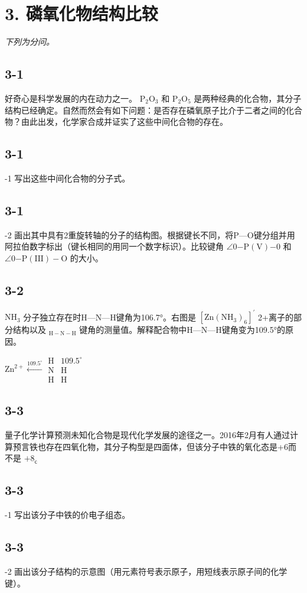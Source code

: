 \section*{3. 磷氧化物结构比较}
\textit{下列为分问。}

\subsection*{3-1}
好奇⼼是科学发展的内在动⼒之⼀。 $\mathrm { P _ { 2 } O _ { 3 } }$ 和 $\mathrm { P _ { 2 } O _ { 5 } }$ 是两种经典的化合物，其分⼦结构已经确定。⾃然⽽然会有如下问题：是否存在磷氧原⼦⽐介于⼆者之间的化合物？由此出发，化学家合成并证实了这些中间化合物的存在。

\subsection*{3-1}
-1 写出这些中间化合物的分⼦式。

\subsection*{3-1}
-2 画出其中具有2重旋转轴的分⼦的结构图。根据键⻓不同，将P—O键分组并⽤阿拉伯数字标出（键⻓相同的⽤同⼀个数字标识）。⽐较键⻆ $\angle 0 { \mathrm { - } } \mathrm { P } ( \mathrm { V } ) { \mathrm { - } } 0$ 和 $\angle 0 { \mathrm { - P ( I I I ) { - } O } }$ 的⼤⼩。

\subsection*{3-2}
$\mathrm { N H _ { 3 } }$ 分⼦独⽴存在时H—N—H键⻆为106.7°。右图是 $\mathrm { [ Z n ( N H _ { 3 } ) _ { 6 } ] } ^ { \prime }$ 2+离⼦的部分结构以及 $_ \mathrm { H - N - H }$ 键⻆的测量值。解释配合物中H—N—H键⻆变为109.5°的原因。

$
\mathrm{Zn} ^ {2 +} \xleftarrow {1 0 9 . 5 ^ {\circ}} \begin{array}{c} \mathrm{H} \\ \mathrm{N} \\ \mathrm{H} \end{array} \begin{array}{c} 1 0 9. 5 ^ {\circ} \\ \mathrm{H} \\ \mathrm{H} \end{array}
$

\subsection*{3-3}
量⼦化学计算预测未知化合物是现代化学发展的途径之⼀。2016年2⽉有⼈通过计算预⾔铁也存在四氧化物，其分⼦构型是四⾯体，但该分⼦中铁的氧化态是+6⽽不是 $+ 8 _ { \mathsf { c } }$

\subsection*{3-3}
-1 写出该分⼦中铁的价电⼦组态。

\subsection*{3-3}
-2 画出该分⼦结构的⽰意图（⽤元素符号表⽰原⼦，⽤短线表⽰原⼦间的化学键）。
